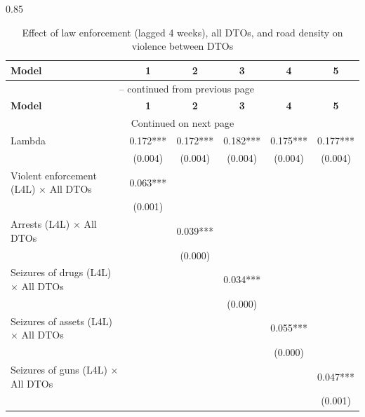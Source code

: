\documentclass[12pt,letterpaper]{article}
\begin{document}



\begin{landscape}

\begin{center}
\small
\begin{spacing}{0.85}
\begin{longtable}{lccccc}

\caption{Effect of law enforcement (lagged 4 weeks), all DTOs, and road density on violence between DTOs} \label{tab:enforcement_allDTOs_Road_L4L} \\

\hline 
\multicolumn{1}{l}{\textbf{Model }} &\multicolumn{1}{c}{\textbf{1}} & \multicolumn{1}{c}{\textbf{2}} & \multicolumn{1}{c}{\textbf{3}} & \multicolumn{1}{c}{\textbf{4}} & \multicolumn{1}{c}{\textbf{ 5}} \\ \hline 
\endfirsthead


\multicolumn{6}{c}{{\tablename\ \thetable{} -- continued from previous page}} \\ \hline
\multicolumn{1}{l}{\textbf{Model }} &\multicolumn{1}{c}{\textbf{1}} & \multicolumn{1}{c}{\textbf{2}} & \multicolumn{1}{c}{\textbf{3}} & \multicolumn{1}{c}{\textbf{4}} & \multicolumn{1}{c}{\textbf{ 5}} \\ \hline 
\endhead

\hline \multicolumn{6}{c}{{Continued on next page}} \\ \hline
\endfoot

\hline \hline
\endlastfoot

Lambda & 0.172*** & 0.172*** & 0.182*** & 0.175*** & 0.177***  \\ 
 & (0.004)  & (0.004)  & (0.004)  & (0.004)  & (0.004)   \\ 
                 
Violent enforcement (L4L) $\times$ All DTOs & 0.063*** &   &   &   &    \\ 
 & (0.001)  &   &   &   &    \\ 
Arrests  (L4L)  $\times$ All DTOs &   & 0.039*** &   &   &    \\ 
 &   & (0.000)  &   &   &    \\ 
Seizures of drugs  (L4L)  $\times$ All DTOs &   &   & 0.034*** &   &    \\ 
 &   &   & (0.000)  &   &    \\ 
 Seizures of assets  (L4L)  $\times$ All DTOs &   &   &   & 0.055*** &    \\ 
 &   &   &   & (0.000)  &    \\ 
 Seizures of guns  (L4L) $\times$ All DTOs &   &   &   &   & 0.047***  \\ 
 &   &   &   &   & (0.001)   \\ 
                 

\end{longtable}
\end{spacing}
\end{center}
\end{landscape}
\end{document}
